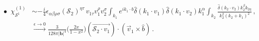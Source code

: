 \begin{align}
    \begin{split}
  \\
      \bullet \,\,\, \chi_{\mathcal{S}^1}^{(1)}&\sim -\frac{i}{4}\epsilon_{\alpha\beta\rho\sigma}(\mathcal{S}_2)^{\eta\tau}\,v_{1\tau}v_1^\rho v_2^\sigma \int_{k_1}e^{ik_1\cdot b}\hat\delta(k_1\cdot v_1)\hat\delta(k_1\cdot v_2)k_1^\alpha \int_{k_2}\frac{\hat\delta(k_2\cdot v_2)k_2^\beta k_{2\eta}}{k_2^2(k_2+k_1)^2}\,,\\ &
      \xrightarrow[]{\epsilon\to 0}\frac{3}{128\pi |\boldsymbol{b}|^4} \Bigg(\frac{2x}{1-x^2}\Bigg)(\overrightarrow{\mathcal{S}_2\cdot v_1})\cdot (\vec v_1\times \hat b)\,.
      \\ &

\end{split}
\end{align}
